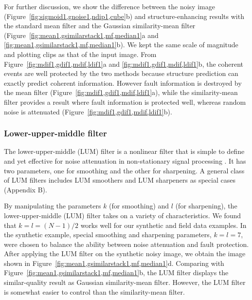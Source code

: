 For further discussion, we show the difference between the noisy image
(Figure~\ref{fig:sigmoid1,gnoise1,ndip1,cube}b) and
structure-enhancing results with the standard mean filter and the
Gaussian similarity-mean filter
(Figure~\ref{fig:mean1,gsimilarstack1,mf,median1}a and
\ref{fig:mean1,gsimilarstack1,mf,median1}b). We kept the same scale of
magnitude and plotting clips as that of the input image. From
Figure~\ref{fig:mdif1,gdif1,mdif,ldif1}a and
\ref{fig:mdif1,gdif1,mdif,ldif1}b, the coherent events are
well protected by the two methods because structure prediction can
exactly predict coherent information. However fault information is
destroyed by the mean filter
(Figure~\ref{fig:mdif1,gdif1,mdif,ldif1}a), while the similarity-mean
filter provides a result where fault information is protected well,
whereas random noise is attenuated
(Figure~\ref{fig:mdif1,gdif1,mdif,ldif1}b).


   \subsubsection{Lower-upper-middle filter}

The lower-upper-middle (LUM) filter is a nonlinear
filter that is simple to define and yet effective for noise
attenuation in non-stationary signal processing \cite[]{Hardie93}.  It
has two parameters, one for smoothing and the other for sharpening. A
general class of LUM filters includes LUM smoothers and LUM sharpeners
as special cases (Appendix B).

By manipulating the parameters $k$ (for smoothing) and $l$ (for
sharpening), the lower-upper-middle (LUM) filter takes
on a variety of characteristics. We found that $k=l=(N-1)/2$ works
well for our synthetic and field data examples. In the synthetic
example, special smoothing and sharpening parameters, $k=l=7$, were
chosen to balance the ability between noise attenuation and fault
protection. After applying the LUM filter on the synthetic noisy
image, we obtain the image shown in
Figure~\ref{fig:mean1,gsimilarstack1,mf,median1}d. Comparing with
Figure~\ref{fig:mean1,gsimilarstack1,mf,median1}b, the LUM filter
displays the similar-quality result as Gaussian similarity-mean
filter. However, the LUM filter is somewhat easier to control than the
similarity-mean filter.

